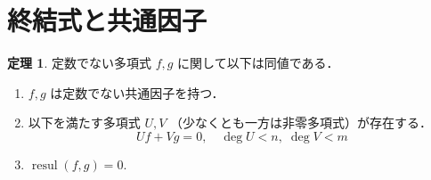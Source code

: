 \documentclass[12pt, uplatex, dvipdfmx]{jsarticle}
\theoremstyle{definition}
\newtheorem{theorem}{定理}
\DeclareMathOperator{\resul}{resul}
\begin{document}
\section{終結式と共通因子}

\begin{theorem}\label{thm:common-factor}
  定数でない多項式 $f,g$ に関して以下は同値である．
  \begin{enumerate}[(1)]
  \item $f, g$ は定数でない共通因子を持つ．%
  \item 以下を満たす多項式 $U, V$ （少なくとも一方は非零多項式）が存在する．
    \[
      Uf + Vg = 0, \quad \deg U <n, \; \deg V <m
    \]
  \item $\resul(f,g) = 0$.
  \end{enumerate}
\end{theorem}
\end{document}
